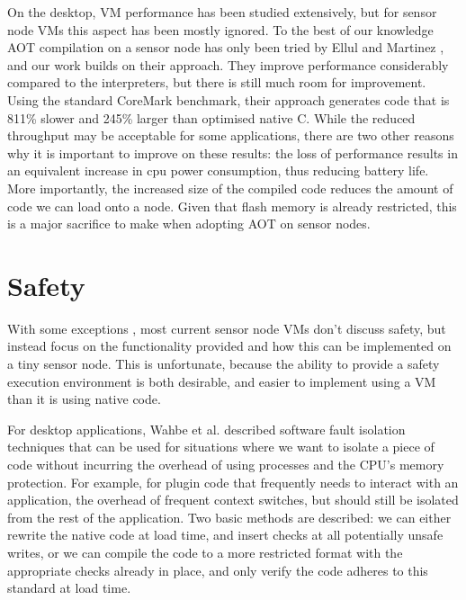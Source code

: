 On the desktop, VM performance has been studied extensively, but for sensor node VMs this aspect has been mostly ignored. To the best of our knowledge AOT compilation on a sensor node has only been tried by Ellul and Martinez \cite{Ellul:2010iw}, and our work builds on their approach. They improve performance considerably compared to the interpreters, but there is still much room for improvement. Using the standard CoreMark benchmark, their approach generates code that is 811\% slower and 245\% larger than optimised native C. While the reduced throughput may be acceptable for some applications, there are two other reasons why it is important to improve on these results: the loss of performance results in an equivalent increase in cpu power consumption, thus reducing battery life. More importantly, the increased size of the compiled code reduces the amount of code we can load onto a node. Given that flash memory is already restricted, this is a major sacrifice to make when adopting AOT on sensor nodes.


\section{Safety}
With some exceptions \cite{Evers:2010ur}, most current sensor node VMs don't discuss safety, but instead focus on the functionality provided and how this can be implemented on a tiny sensor node. This is unfortunate, because the ability to provide a safety execution environment is both desirable, and easier to implement using a VM than it is using native code.

For desktop applications, Wahbe et al. described software fault isolation \cite{Wahbe:1994cj} techniques that can be used for situations where we want to isolate a piece of code without incurring the overhead of using processes and the CPU's memory protection. For example, for plugin code that frequently needs to interact with an application, the overhead of frequent context switches, but should still be isolated from the rest of the application. Two basic methods are described: we can either rewrite the native code at load time, and insert checks at all potentially unsafe writes, or we can compile the code to a more restricted format with the appropriate checks already in place, and only verify the code adheres to this standard at load time.


